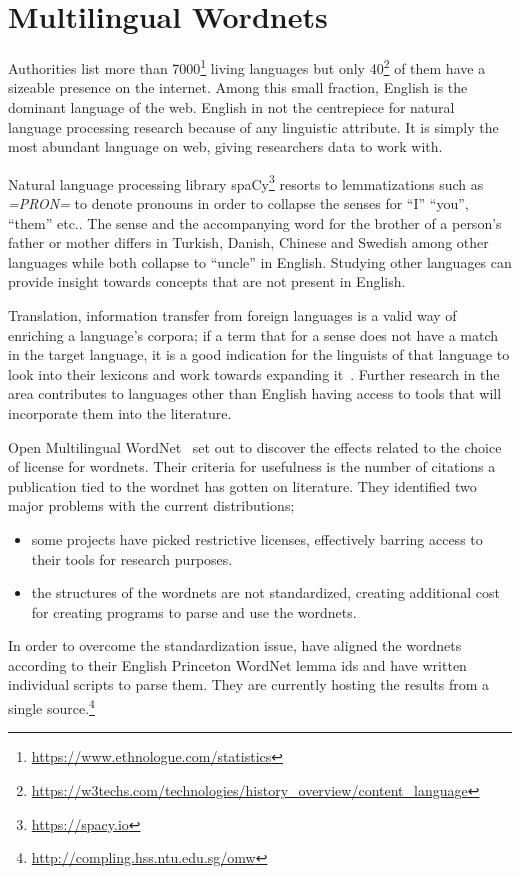 \section{Multilingual Wordnets}%
\label{sec:multilingual_wordnets}
Authorities list more than 7000\footnote{\url{https://www.ethnologue.com/statistics}} living languages but only 40\footnote{\url{https://w3techs.com/technologies/history_overview/content_language}} of them have a sizeable presence on the internet.
Among this small fraction, English is the dominant language of the web.
English in not the centrepiece for natural language processing research because of any linguistic attribute.
It is simply the most abundant language on web, giving researchers data to work with.

Natural language processing library spaCy\footnote{\url{https://spacy.io}} resorts to lemmatizations such as \emph{=PRON=} to denote pronouns in order to collapse the senses for \enquote{I} \enquote{you}, \enquote{them} etc.\@.
The sense and the accompanying word for the brother of a person's father or mother differs in Turkish, Danish, Chinese and Swedish among other languages while both collapse to \enquote{uncle} in English.
Studying other languages can provide insight towards concepts that are not present in English.

Translation, information transfer from foreign languages is a valid way of enriching a language's corpora; if a term that for a sense does not have a match in the target language, it is a good indication for the linguists of that language to look into their lexicons and work towards expanding it~\cite{ibrahim_usta_turkce_2006}.
Further research in the area contributes to languages other than English having access to tools that will incorporate them into the literature.

Open Multilingual WordNet~\cite{bondSurvey2012, bond_linking_2013} set out to discover the effects related to the choice of license for wordnets.
Their criteria for usefulness is the number of citations a publication tied to the wordnet has gotten on literature.
They identified two major problems with the current distributions;
\begin{itemize}
    \item some projects have picked restrictive licenses, effectively barring access to their tools for research purposes.
    \item the structures of the wordnets are not standardized, creating additional cost for creating programs to parse and use the wordnets.
\end{itemize}
In order to overcome the standardization issue, \citeauthor{bondSurvey2012} have aligned the wordnets according to their English Princeton WordNet lemma ids and have written individual scripts to parse them.
They are currently hosting the results from a single source.\footnote{\url{http://compling.hss.ntu.edu.sg/omw}}

